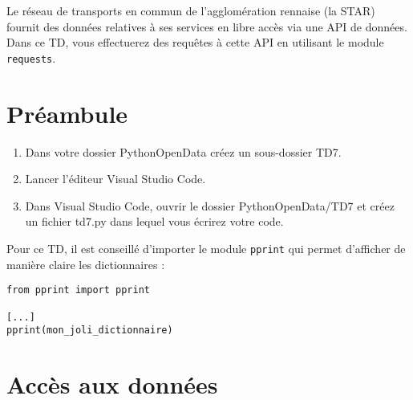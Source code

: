 \documentclass[11pt,a4paper]{article}
\begin{document}
Le réseau de transports en commun de l'agglomération rennaise (la STAR) fournit des données relatives à ses services en libre accès via une API de données.
Dans ce TD, vous effectuerez des requêtes à cette API en utilisant le module \verb+requests+.

\section*{Préambule}
\begin{enumerate}
    \item Dans votre dossier PythonOpenData créez un sous-dossier TD7.
    \item Lancer l'éditeur Visual Studio Code.
    \item Dans Visual Studio Code, ouvrir le dossier PythonOpenData/TD7 et créez un fichier td7.py dans lequel vous écrirez votre code. 
\end{enumerate}

Pour ce TD, il est conseillé d'importer le module \verb+pprint+ qui permet d'afficher de manière claire les dictionnaires :

\begin{verbatim}
from pprint import pprint

[...]
pprint(mon_joli_dictionnaire)
\end{verbatim}

\section{Accès aux données}
\end{document}
